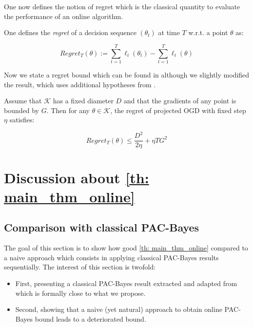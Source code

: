 \begin{noaddcontents}
One now defines the notion of regret which is the classical quantity to evaluate the performance of an online algorithm.
 \begin{definition}
One defines the \emph{regret} of a decision sequence $(\theta_t)$ at time $T$  w.r.t. a point $\theta$ as:

\[ Regret_T(\theta):= \sum_{t=1}^T \ell_t(\theta_t) -  \sum_{t=1}^T \ell_t(\theta)  \]


\end{definition}


Now we state a regret bound which can be found in \cite[Eq 2.5]{shalev2012online} although we slightly modified the result, which uses additional hypotheses from \cite{hazan2016introduction}.

\begin{proposition}
  \label{prop: OGD_bound}
  Assume that $\mathcal{K}$ has a fixed diameter $D$ and that the gradients of any point is bounded by $G$. Then for any $\theta\in\mathcal{K}$, the regret of projected OGD with fixed step $\eta$ satisfies:

  \[ Regret_T(\theta) \leq \frac{D^2}{2\eta} + \eta T G^2     \]
\end{proposition}







\section{Discussion about \cref{th: main_thm_online}}
\label{sec: discussion_main_thm}

\subsection{Comparison with classical PAC-Bayes}

\label{sec: comparison_main_thm}

The goal of this section is to show how good \cref{th: main_thm_online} compared to a naive approach which consists in applying classical PAC-Bayes results sequentially. The interest of this section is twofold:

\begin{itemize}
  \item First, presenting a classical PAC-Bayes result extracted and adapted from \cite{alquier2016properties} which is formally close to what we propose.
  \item Second, showing that a naive (yet natural) approach to obtain online PAC-Bayes bound leads to a deteriorated bound.
\end{itemize}


\end{noaddcontents}
